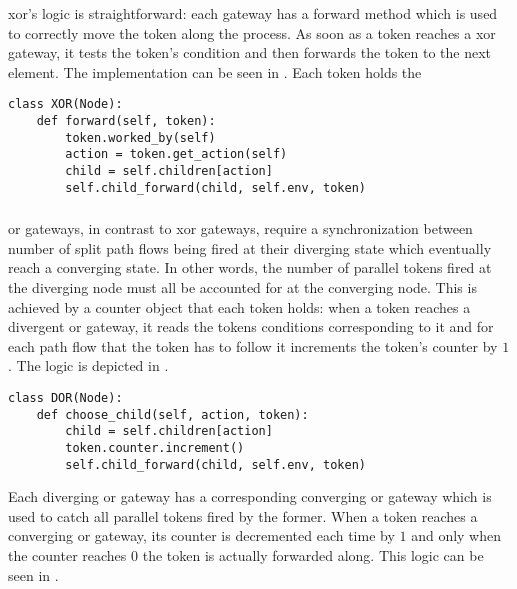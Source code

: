 \subsubsection{}

\gls{xor}'s logic is straightforward: each gateway has a forward method which is used to correctly move the token along the process. As soon as a token reaches a \gls{xor} gateway, it tests the token's condition and then forwards the token to the next element. The implementation can be seen in . Each token holds the 

\begin{lstlisting}[caption=\glsentryshort{xor}'s forward method,label=lst:xor_forward,style=CustomPython]
class XOR(Node):
    def forward(self, token):
        token.worked_by(self)
        action = token.get_action(self)
        child = self.children[action]
        self.child_forward(child, self.env, token)
\end{lstlisting}

\subsubsection{}

\gls{or} gateways, in contrast to \gls{xor} gateways, require a synchronization between number of split path flows being fired at their diverging state which eventually reach a converging state. In other words, the number of parallel tokens fired at the diverging node must all be accounted for at the converging node. This is achieved by a counter object that each token holds: when a token reaches a divergent \gls{or} gateway, it reads the tokens conditions corresponding to it and for each path flow that the token has to follow it increments the token's counter by $1$. The logic is depicted in .

\begin{lstlisting}[caption=Token's counter increment logic at a divergent \glsentryshort{or} gateway,label=lst:or_counter_increment,style=CustomPython]
class DOR(Node):
    def choose_child(self, action, token):
        child = self.children[action]
        token.counter.increment()
        self.child_forward(child, self.env, token)
\end{lstlisting}

Each diverging \gls{or} gateway has a corresponding converging \gls{or} gateway which is used to catch all parallel tokens fired by the former. When a token reaches a converging \gls{or} gateway, its counter is decremented each time by $1$ and only when the counter reaches $0$ the token is actually forwarded along. This logic can be seen in .

